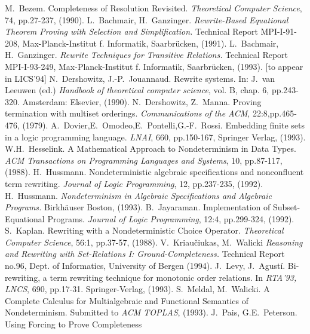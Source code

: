 \begin{thebibliography}{MM99}\MyLPar
{} M.~Bezem. 
   Completeness of Resolution Revisited. 
   {\em Theoretical Computer Science}, 74, pp.27-237, (1990).
 L.~Bachmair, H.~Ganzinger. 
   {\em Rewrite-Based Equational Theorem Proving with 
                           Selection and Simplification.}
   Technical Report MPI-I-91-208, Max-Planck-Institut f. Informatik, 
   Saarbr\"ucken, (1991).
 L.~Bachmair, H.~Ganzinger. 
   {\em Rewrite Techniques for Transitive Relations.}
   Technical Report MPI-I-93-249, Max-Planck-Institut f. Informatik, 
   Saarbr\"ucken, (1993). [to appear in LICS'94]
 N.~Dershowitz, J.-P.~Jouannaud. 
   Rewrite systems. In: J.~van Leeuwen (ed.) 
   {\em Handbook of theoretical computer science}, vol. B,
   chap. 6, pp.243-320. Amsterdam: Elsevier, (1990).
 N.~Dershowitz, Z.~Manna. 
   Proving termination with multiset orderings. 
   {\em Communications of the ACM}, 22:8,pp.465-476, (1979).
 A.~Dovier,E.~Omodeo,E.~Pontelli,G.-F.~Rossi. 
   Embedding finite sets in a logic programming language. 
   {\em LNAI}, 660, pp.150-167, Springer Verlag, (1993).
 W.H.~Hesselink. A Mathematical Approach to Nondeterminism
   in Data Types. {\em ACM Transactions on Programming Languages and Systems},
   10, pp.87-117, (1988).
 H.~Hussmann. Nondeterministic algebraic
   specifications and nonconfluent term rewriting. {\em Journal of Logic
   Programming}, 12, pp.237-235, (1992).
 H.~Hussmann. 
   {\em Nondeterminism in Algebraic Specifications and Algebraic Programs.}
   Birkh\"auser Boston, (1993).
 B.~Jayaraman. Implementation of Subset-Equational 
   Programs. {\em Journal of Logic Programming}, 12:4, pp.299-324, (1992).
 S.~Kaplan. Rewriting with a Nondeterministic Choice
   Operator. {\it Theoretical Computer Science}, 56:1, pp.37-57, (1988).
 V.~Kriau\v ciukas, M.~Walicki
   {\em Reasoning and Rewriting with Set-Relations I: Ground-Completeness.}
   Technical Report no.96, Dept. of Informatics, University of Bergen (1994).
 J.~Levy, J.~Agust\'i. Bi-rewriting, a term rewriting
   technique for monotonic order relations. In {\em RTA'93, LNCS}, 
   690, pp.17-31. Springer-Verlag, (1993).
 S.~Meldal, M.~Walicki. A Complete Calculus for 
   Multialgebraic and Functional Semantics of Nondeterminism. 
   Submitted to {\em ACM TOPLAS}, (1993).
 J.~Pais, G.E.~Peterson. Using Forcing to Prove Completeness

\end{thebibliography}
